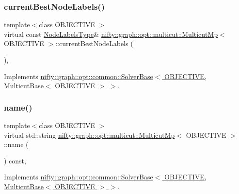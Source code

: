 \subsubsection{\texorpdfstring{current\+Best\+Node\+Labels()}{currentBestNodeLabels()}}
{\footnotesize\ttfamily template$<$class O\+B\+J\+E\+C\+T\+I\+VE $>$ \\
virtual const \hyperlink{classnifty_1_1graph_1_1opt_1_1multicut_1_1MulticutMp_a7afb88ab31185de5cef8a3d98022c0a2}{Node\+Labels\+Type}\& \hyperlink{classnifty_1_1graph_1_1opt_1_1multicut_1_1MulticutMp}{nifty\+::graph\+::opt\+::multicut\+::\+Multicut\+Mp}$<$ O\+B\+J\+E\+C\+T\+I\+VE $>$\+::current\+Best\+Node\+Labels (\begin{DoxyParamCaption}{ }\end{DoxyParamCaption})\hspace{0.3cm}{\ttfamily [inline]}, {\ttfamily [virtual]}}



Implements \hyperlink{classnifty_1_1graph_1_1opt_1_1common_1_1SolverBase_a7bbe01ee201cf3157b251e54c5ff0619}{nifty\+::graph\+::opt\+::common\+::\+Solver\+Base$<$ O\+B\+J\+E\+C\+T\+I\+V\+E, Multicut\+Base$<$ O\+B\+J\+E\+C\+T\+I\+V\+E $>$ $>$}.

\mbox{\label{classnifty_1_1graph_1_1opt_1_1multicut_1_1MulticutMp_ad70677c1535224e3ebd403d30faccbd9}} 
\subsubsection{\texorpdfstring{name()}{name()}}
{\footnotesize\ttfamily template$<$class O\+B\+J\+E\+C\+T\+I\+VE $>$ \\
virtual std\+::string \hyperlink{classnifty_1_1graph_1_1opt_1_1multicut_1_1MulticutMp}{nifty\+::graph\+::opt\+::multicut\+::\+Multicut\+Mp}$<$ O\+B\+J\+E\+C\+T\+I\+VE $>$\+::name (\begin{DoxyParamCaption}{ }\end{DoxyParamCaption}) const\hspace{0.3cm}{\ttfamily [inline]}, {\ttfamily [virtual]}}



Implements \hyperlink{classnifty_1_1graph_1_1opt_1_1common_1_1SolverBase_af638b9a804cfec3e35fe87c77e942d30}{nifty\+::graph\+::opt\+::common\+::\+Solver\+Base$<$ O\+B\+J\+E\+C\+T\+I\+V\+E, Multicut\+Base$<$ O\+B\+J\+E\+C\+T\+I\+V\+E $>$ $>$}.

